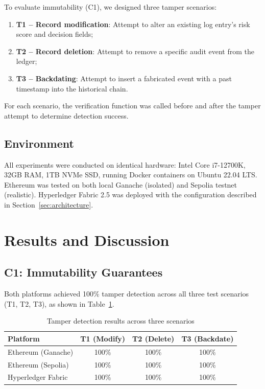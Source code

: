 \documentclass[12pt,a4paper]{article}
\begin{document}
To evaluate immutability (C1), we designed three tamper scenarios:

\begin{enumerate}
    \item \textbf{T1 -- Record modification}: Attempt to alter an existing log entry's risk score and decision fields;
    \item \textbf{T2 -- Record deletion}: Attempt to remove a specific audit event from the ledger;
    \item \textbf{T3 -- Backdating}: Attempt to insert a fabricated event with a past timestamp into the historical chain.
\end{enumerate}

For each scenario, the verification function was called before and after the tamper attempt to determine detection success.

\subsection{Environment}

All experiments were conducted on identical hardware: Intel Core i7-12700K, 32GB RAM, 1TB NVMe SSD, running Docker containers on Ubuntu 22.04 LTS. Ethereum was tested on both local Ganache (isolated) and Sepolia testnet (realistic). Hyperledger Fabric 2.5 was deployed with the configuration described in Section~\ref{sec:architecture}.

\section{Results and Discussion}
\label{sec:results}

\subsection{C1: Immutability Guarantees}

Both platforms achieved 100\% tamper detection across all three test scenarios (T1, T2, T3), as shown in Table~\ref{tab:immutability}.

\begin{table}[H]
\centering
\caption{Tamper detection results across three scenarios}
\label{tab:immutability}
\begin{tabular}{@{}lccc@{}}
\toprule
\textbf{Platform} & \textbf{T1 (Modify)} & \textbf{T2 (Delete)} & \textbf{T3 (Backdate)} \\
\midrule
Ethereum (Ganache)   & 100\% & 100\% & 100\% \\
Ethereum (Sepolia)   & 100\% & 100\% & 100\% \\
Hyperledger Fabric   & 100\% & 100\% & 100\% \\
\bottomrule
\end{tabular}
\end{table}
\end{document}
